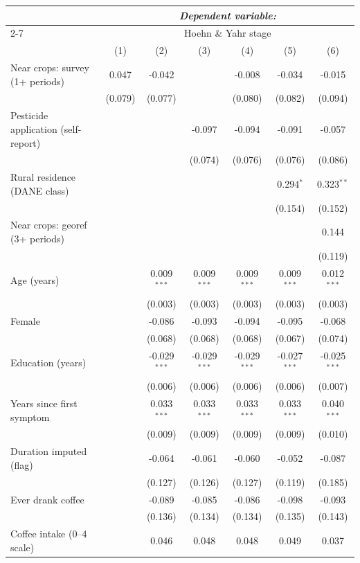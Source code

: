 \begin{tabular}{lcccccc}
\hline\hline
 & \multicolumn{6}{c}{\textit{Dependent variable:}} \\
\cline{2-7}
 & \multicolumn{6}{c}{Hoehn \& Yahr stage} \\
 & (1) & (2) & (3) & (4) & (5) & (6) \\
\hline
Near crops: survey (1+ periods) & 0.047 & -0.042 &  & -0.008 & -0.034 & -0.015 \\
 & (0.079) & (0.077) &  & (0.080) & (0.082) & (0.094) \\
Pesticide application (self-report) &  &  & -0.097 & -0.094 & -0.091 & -0.057 \\
 &  &  & (0.074) & (0.076) & (0.076) & (0.086) \\
Rural residence (DANE class) &  &  &  &  & 0.294$^{*}$ & 0.323$^{**}$ \\
 &  &  &  &  & (0.154) & (0.152) \\
Near crops: georef (3+ periods) &  &  &  &  &  & 0.144 \\
 &  &  &  &  &  & (0.119) \\
Age (years) &  & 0.009$^{***}$ & 0.009$^{***}$ & 0.009$^{***}$ & 0.009$^{***}$ & 0.012$^{***}$ \\
 &  & (0.003) & (0.003) & (0.003) & (0.003) & (0.003) \\
Female &  & -0.086 & -0.093 & -0.094 & -0.095 & -0.068 \\
 &  & (0.068) & (0.068) & (0.068) & (0.067) & (0.074) \\
Education (years) &  & -0.029$^{***}$ & -0.029$^{***}$ & -0.029$^{***}$ & -0.027$^{***}$ & -0.025$^{***}$ \\
 &  & (0.006) & (0.006) & (0.006) & (0.006) & (0.007) \\
Years since first symptom &  & 0.033$^{***}$ & 0.033$^{***}$ & 0.033$^{***}$ & 0.033$^{***}$ & 0.040$^{***}$ \\
 &  & (0.009) & (0.009) & (0.009) & (0.009) & (0.010) \\
Duration imputed (flag) &  & -0.064 & -0.061 & -0.060 & -0.052 & -0.087 \\
 &  & (0.127) & (0.126) & (0.127) & (0.119) & (0.185) \\
Ever drank coffee &  & -0.089 & -0.085 & -0.086 & -0.098 & -0.093 \\
 &  & (0.136) & (0.134) & (0.134) & (0.135) & (0.143) \\
Coffee intake (0--4 scale) &  & 0.046 & 0.048 & 0.048 & 0.049 & 0.037 \\

\end{tabular}
